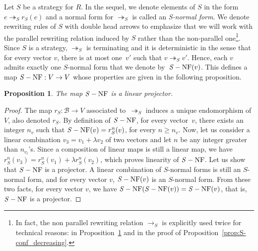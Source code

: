 \documentclass[11pt]{article}
\newtheorem{proposition}[theorem]{Proposition}
\theoremstyle{definition}
\newcommand\basis{\mathscr{B}}
\newcommand\parS{\twoheadrightarrow_S}
\DeclareMathOperator{\SNF}{{\it S}-NF}
\begin{document}
Let $S$ be a strategy for $R$. In the sequel, we denote elements of $S$
in the form $e\parS r_S(e)$ and a normal form for $\parS$ is called an
{\em S-normal form}. We denote rewriting rules of $S$ with double head
arrows to emphasize that we will work with the parallel rewriting
relation induced by $S$ rather than the non-parallel one\footnote{In
  fact, the non parallel rewriting relation $\to_S$ is explicitly used
  twice for technical reasons: in Proposition~\ref{prop:linearity_of_SNF}
  and in the proof of Proposition~\ref{prop:S-conf_decreasing}.}. Since
$S$ is a strategy, $\parS$ is terminating and it is deterministic in the
sense that for every vector $v$, there is at most one~$v'$ such that
$v\parS v'$. Hence, each $v$ admits exactly one $S$-normal form that we
denote by~$\SNF(v)$. This defines a map $\SNF:V\to V$ whose properties
are given in the following proposition.
\smallskip

\begin{proposition}\label{prop:linearity_of_SNF}
  The map $\SNF$ is a linear projector. 
\end{proposition}

\begin{proof}
  The map $r_S:\basis\to V$ associated to~$\parS$ induces a unique endomorphism of
  $V$, also denoted $r_S$. By definition of $\SNF$, for every vector~$v$, there
  exists an integer $n_v$ such that $\SNF(v)=r_S^n(v)$, for every $n\geq n_v$. Now,
  let us consider a linear combination $v_3=v_1+\lambda v_2$ of two vectors and let
  $n$ be any integer greater than $n_{v_i}$'s. Since a composition of linear
  maps is still a linear map, we have
  $r_S^n(v_3)=r_S^n(v_1)+\lambda r_S^n(v_2)$, which proves linearity of $\SNF$. Let us
  show that $\SNF$ is a projector. A linear combination of $S$-normal forms is
  still an $S$-normal form, and for every vector $v$, $\SNF(v)$ is an $S$-normal
  form. From these two facts, for every vector $v$, we have
  $\SNF(\SNF(v))=\SNF(v)$, that is, $\SNF$ is a projector.
\end{proof}
\end{document}
